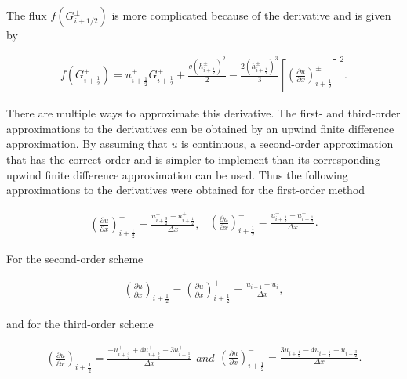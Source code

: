 \documentclass[SingleSpace,12pt]{Serre_ASCE}
\begin{document}
The flux $f(G^\pm_{i + 1/2})$ is more complicated because of the derivative and is given by
\begin{linenomath*}
\begin{gather}\label{eq:fforGp}
f\left(G^\pm_{i + \frac{1}{2}}\right)= u^\pm_{i + \frac{1}{2}} G^\pm_{i + \frac{1}{2}} + \frac{g \left(h^\pm_{i + \frac{1}{2}} \right)^2}{2} - \frac{2 \left(h^\pm_{i + \frac{1}{2}} \right)^3}{3} \left[\left(\frac{\partial u}{\partial x}\right)^\pm_{i + \frac{1}{2}}\right]^2.
\end{gather}
\end{linenomath*}
There are multiple ways to approximate this derivative. The first- and third-order approximations to the derivatives can be obtained by an upwind finite difference approximation. By assuming that $u$ is continuous, a second-order approximation that has the correct order and is simpler to implement than its corresponding upwind finite difference approximation can be used. Thus the following approximations to the derivatives were obtained for the first-order method
\begin{linenomath*}
\begin{subequations}
\begin{gather}\label{eq:derivdisco1p}
\left(\frac{\partial u}{\partial x}\right)^+_{i + \frac{1}{2}} = \frac{ u^+_{i + \frac{3}{2}} - u^+_{i + \frac{1}{2}}}{\Delta x},
\end{gather}
\begin{gather}\label{eq:derivdisco1m}
\left(\frac{\partial u}{\partial x}\right)^-_{i + \frac{1}{2}} = \frac{ u^-_{i + \frac{1}{2}} - u^-_{i - \frac{1}{2}}}{\Delta x}.
\end{gather}
\end{subequations}
\label{eq:derivdisco1}
\end{linenomath*}
For the second-order scheme
\begin{linenomath*}
\begin{gather}\label{eq:derivdisco2}
\left(\frac{\partial u}{\partial x}\right)^-_{i + \frac{1}{2}} = \left(\frac{\partial u}{\partial x}\right)^+_{i + \frac{1}{2}} = \frac{u_{i + 1} - u_{i}}{\Delta x},
\end{gather}
\end{linenomath*}
and for the third-order scheme
\begin{linenomath*}
\begin{subequations}
\begin{gather}\label{eq:derivdisco3p}
\left(\frac{\partial u}{\partial x}\right)^+_{i + \frac{1}{2}} = \frac{ -u^+_{i + \frac{3}{2}} + 4u^+_{i + \frac{3}{2}}  -3 u^+_{i + \frac{1}{2}}}{\Delta x}
\end{gather}
and
\begin{gather}\label{eq:derivdisco3m}
\left(\frac{\partial u}{\partial x}\right)^-_{i + \frac{1}{2}} = \frac{ 3u^-_{i + \frac{1}{2}} - 4u^-_{i - \frac{1}{2}} + u^-_{i - \frac{3}{2}}}{\Delta x}.
\end{gather}
\end{subequations}
\label{eq:derivdisco3}
\end{linenomath*}
\end{document}

